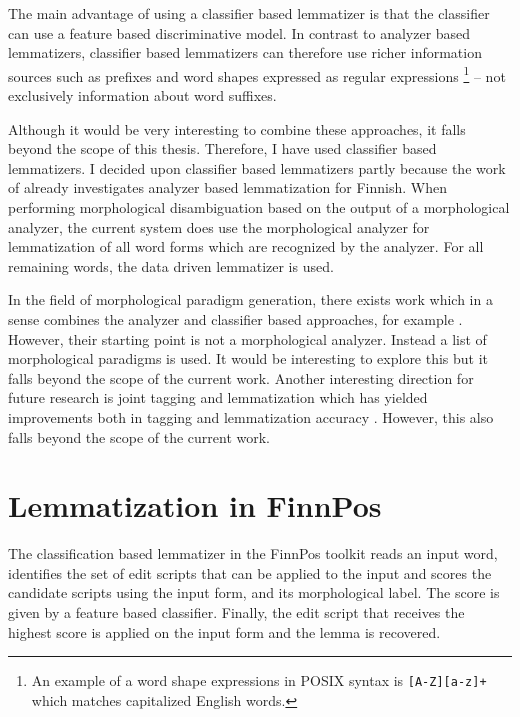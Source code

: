 The main advantage of using a classifier based lemmatizer is that the
classifier can use a feature based discriminative model. In contrast
to analyzer based lemmatizers, classifier based lemmatizers can
therefore use richer information sources such as prefixes and word
shapes expressed as regular expressions \footnote{An example of a word
  shape expressions in POSIX syntax is {\tt [A-Z][a-z]+} which matches
  capitalized English words.} -- not exclusively information about
word suffixes.

Although it would be very interesting to combine these approaches, it
falls beyond the scope of this thesis. Therefore, I have used
classifier based lemmatizers. I decided upon classifier based
lemmatizers partly because the work of \cite{Linden2009} already
investigates analyzer based lemmatization for Finnish. When performing
morphological disambiguation based on the output of a morphological
analyzer, the current system does use the morphological analyzer for
lemmatization of all word forms which are recognized by the
analyzer. For all remaining words, the data driven lemmatizer is used.

In the field of morphological paradigm generation, there exists work
which in a sense combines the analyzer and classifier based
approaches, for example \citep{Hulden2014}. However, their starting
point is not a morphological analyzer. Instead a list of morphological
paradigms is used. It would be interesting to explore this but it
falls beyond the scope of the current work. Another interesting
direction for future research is joint tagging and lemmatization which
has yielded improvements both in tagging and lemmatization accuracy
\citep{Muller2015}. However, this also falls beyond the scope of the
current work.


\section{Lemmatization in FinnPos}

The classification based lemmatizer in the FinnPos toolkit reads an
input word, identifies the set of edit scripts that can be applied to
the input and scores the candidate scripts using the input form, and
its morphological label. The score is given by a feature based
classifier. Finally, the edit script that receives the highest score
is applied on the input form and the lemma is recovered.

